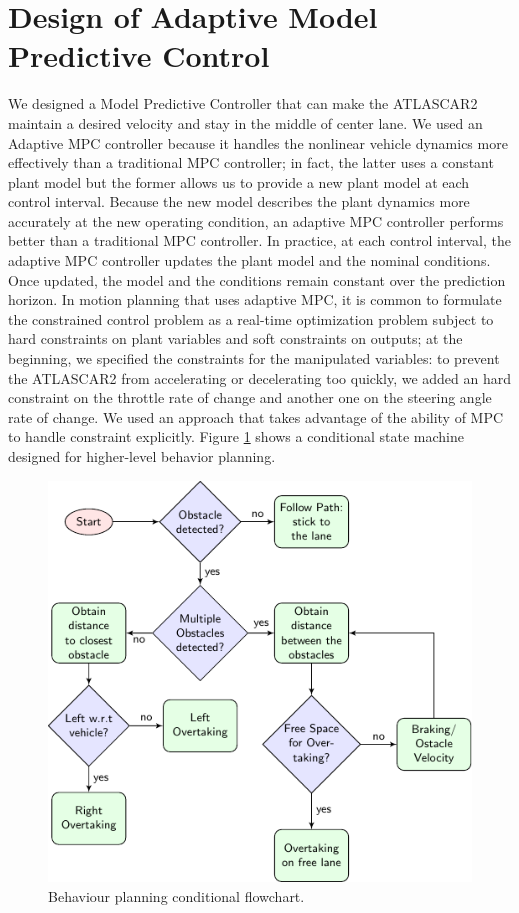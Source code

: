 \section{Design of Adaptive Model Predictive Control}
We designed a Model Predictive Controller that can make the ATLASCAR2 maintain a desired velocity and stay in the middle of center lane. We used an Adaptive MPC controller because it handles the nonlinear vehicle dynamics more effectively than a traditional MPC controller; in fact, the latter uses a constant plant model but the former allows us to provide a new plant model at each control interval. Because the new model describes the plant dynamics more accurately at the new operating condition, an adaptive MPC controller performs better than a traditional MPC controller. In practice, at each control interval, the adaptive MPC controller updates the plant model and the nominal conditions. Once updated, the model and the conditions remain constant over the prediction horizon. In motion planning that uses adaptive MPC, it is common to formulate the constrained control problem as a real-time optimization problem subject to hard constraints on plant variables and soft constraints on outputs; at the beginning, we specified the constraints for the manipulated variables: to prevent the ATLASCAR2 from accelerating or decelerating too quickly, we added an hard constraint on the throttle rate of change and another one on the steering angle rate of change. We used an approach that takes advantage of the ability of MPC to handle constraint explicitly. Figure \ref{fig:flowchart} shows a conditional state machine designed for higher-level behavior planning.

\begin{figure}[!h]
	\centering
	\includegraphics[width=\textwidth]{../figure/flowchart/flowchart.pdf}
	\caption{Behaviour planning conditional flowchart.}
	\label{fig:flowchart}
\end{figure}



